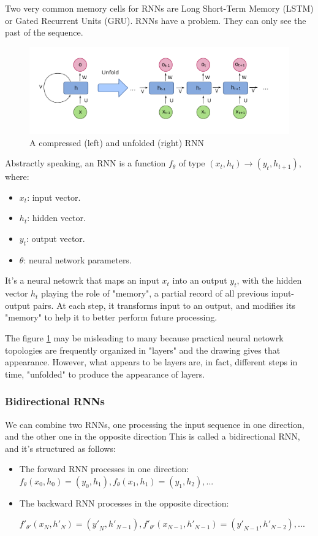 \documentclass{article}
\begin{document}
Two very common memory cells for RNNs are Long Short-Term Memory (LSTM) or Gated Recurrent Units (GRU).
RNNs have a problem. They can only see the past of the sequence.

\begin{figure}[htbp]
  \centering
  \includegraphics[width=0.8\linewidth]{img/rnn_unfolded.png}
  \caption{A compressed (left) and unfolded (right) RNN}
  \label{fig:rnn_unfolded}
\end{figure}

Abstractly speaking, an RNN is a function $f_{\theta}$ of type $(x_t, h_t) \rightarrow (y_t, h_{t+1})$, where:
\begin{itemize}
  \item $x_t$: input vector.
  \item $h_t$: hidden vector.
  \item $y_t$: output vector.
  \item $\theta$: neural network parameters.
\end{itemize}

It's a neural netowrk that maps an input $x_t$ into an output $y_t$, with the hidden vector $h_t$ playing the role of "memory", a partial record of all previous input-output pairs.
At each step, it transforms input to an output, and modifies its "memory" to help it to better perform future processing.

The figure \ref{fig:rnn_unfolded} may be misleading to many because practical neural netowrk topologies are frequently organized in "layers" and the drawing gives that appearance.
However, what appears to be layers are, in fact, different steps in time, "unfolded" to produce the appearance of layers.

\subsubsection{Bidirectional RNNs}

We can combine two RNNs, one processing the input sequence in one direction, and the other one in the opposite direction
This is called a bidirectional RNN, and it's structured as follows:
\begin{itemize}
  \item The forward RNN processes in one direction: $f_{\theta}(x_0, h_0) = (y_0, h_1), f_{\theta}(x_1, h_1) = (y_1, h_2), ...$
  \item The backward RNN processes in the opposite direction:
  
  ${f'}_{\theta '}(x_N, {h'}_N) = ({y'}_N, {h'}_{N-1}), {f'}_{\theta '}(x_{N-1}, {h'}_{N-1}) = ({y'}_{N-1},{h'}_{N-2}), ...$
\end{itemize}
\end{document}
